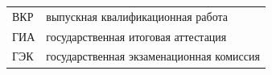 
\noindent
\begin{tabular}{@{}l@{~—~}p{}@{}}
ВКР & выпускная квалификационная работа \\
ГИА & государственная итоговая аттестация \\
ГЭК & государственная экзаменационная комиссия \\
\end{tabular}

